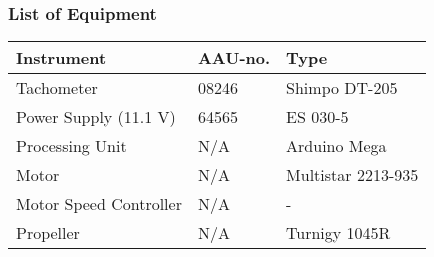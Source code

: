\subsubsection{List of Equipment}
\begin{table}[H]
	\begin{tabular}{|l|l|p{4.3cm}|}
		\hline%
		\textbf{Instrument}                          &  \textbf{AAU-no.}  &  \textbf{Type}                       \\
		\hline%
		Tachometer                                   &  08246             &  Shimpo DT-205		                   \\
		\hline%
	    Power Supply (11.1 V)                        &  64565             &  ES 030-5                 \\
		\hline%
		Processing Unit                              &  N/A               & Arduino Mega     \\
		\hline%
		Motor                                        &  N/A               & Multistar 2213-935     \\
		\hline%
		Motor Speed Controller                       &  N/A               &  -      \\
		\hline%
		Propeller                                    &  N/A               & Turnigy 1045R     \\
		\hline%
	\end{tabular}
\end{table}


